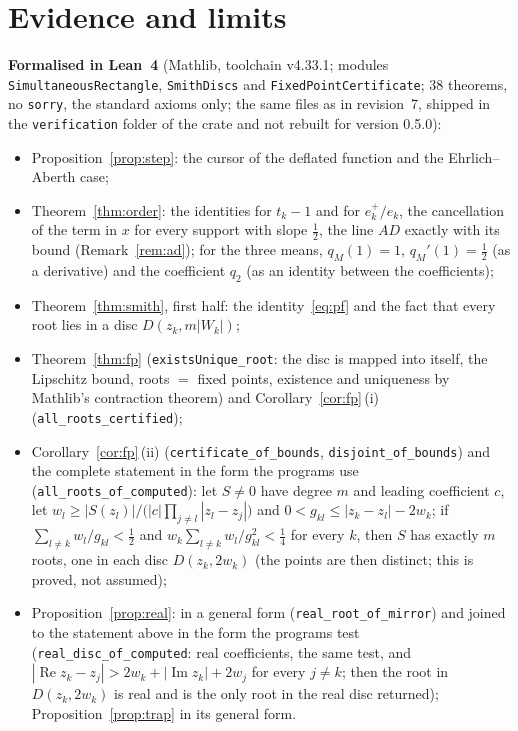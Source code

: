 \documentclass[10pt,a4paper]{article}
\theoremstyle{definition}
\numberwithin{equation}{section}
\begin{document}
\section{Evidence and limits}\label{sec:evidence}
\textbf{Formalised in Lean~4} (Mathlib, toolchain v4.33.1; modules \texttt{SimultaneousRectangle},
\texttt{SmithDiscs} and \texttt{FixedPointCertificate}; 38 theorems, no \texttt{sorry}, the standard
axioms only; the same files as in revision~7, shipped in the \texttt{verification} folder of the crate
and not rebuilt for version 0.5.0):
\begin{itemize}
\item Proposition~\ref{prop:step}: the cursor of the deflated function and the Ehrlich--Aberth case;
\item Theorem~\ref{thm:order}: the identities for $t_k-1$ and for $e_k^+/e_k$, the cancellation of the
 term in $x$ for every support with slope $\frac12$, the line $AD$ exactly with its bound
 (Remark~\ref{rem:ad}); for the three means, $q_M(1)=1$, $q_M'(1)=\frac12$ (as a derivative) and
 the coefficient $q_2$ (as an identity between the coefficients);
\item Theorem~\ref{thm:smith}, first half: the identity~\eqref{eq:pf} and the fact that every root
 lies in a disc $D(z_k,m|W_k|)$;
\item Theorem~\ref{thm:fp} (\texttt{existsUnique\_root}: the disc is mapped into itself, the Lipschitz
 bound, roots $=$ fixed points, existence and uniqueness by Mathlib's contraction theorem) and
 Corollary~\ref{cor:fp}\,(i) (\texttt{all\_roots\_certified});
\item Corollary~\ref{cor:fp}\,(ii) (\texttt{certificate\_of\_bounds}, \texttt{disjoint\_of\_bounds}) and
 the complete statement in the form the programs use (\texttt{all\_roots\_of\_computed}): let $S\ne0$
 have degree $m$ and leading coefficient $c$, let $w_l\ge|S(z_l)|/\bigl(|c|\prod_{j\ne l}|z_l-z_j|\bigr)$
 and $0<g_{kl}\le|z_k-z_l|-2w_k$; if $\sum_{l\ne k}w_l/g_{kl}<\frac12$ and
 $w_k\sum_{l\ne k}w_l/g_{kl}^2<\frac14$ for every $k$, then $S$ has exactly $m$ roots, one in each disc
 $D(z_k,2w_k)$ (the points are then distinct; this is proved, not assumed);
\item Proposition~\ref{prop:real}: in a general form (\texttt{real\_root\_of\_mirror}) and joined to the
 statement above in the form the programs test (\texttt{real\_disc\_of\_computed}: real coefficients,
 the same test, and $|\operatorname{Re}z_k-z_j|>2w_k+|\operatorname{Im}z_k|+2w_j$ for every $j\ne k$;
 then the root in $D(z_k,2w_k)$ is real and is the only root in the real disc returned);
 Proposition~\ref{prop:trap} in its general form.
\end{itemize}
\end{document}
